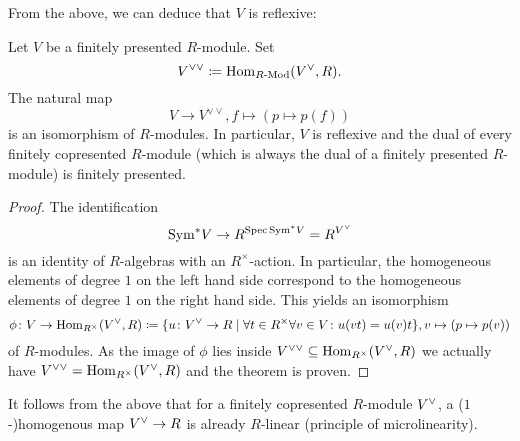 From the above, we can deduce that $V$ is reflexive:

\begin{theorem}
  Let $V$ be a finitely presented $R$-module.  Set
  \begin{equation*}
    V^{\vee\vee} \coloneqq \Hom_{\Mod R}(V\spcheck, R).
  \end{equation*}
  The natural map
  \begin{equation*}
    V \to V^{\vee\vee}, f \mapsto (p \mapsto p(f))
  \end{equation*}
  is an isomorphism of $R$-modules.  In particular, $V$ is reflexive
  and the dual of every finitely copresented $R$-module (which is
  always the dual of a finitely presented $R$-module) is finitely
  presented.
\end{theorem}

\begin{proof}
  The identification
  \begin{equation*}
    \Sym^* V \to R^{\Spec \Sym^* V} = R^{V\spcheck}
  \end{equation*}
  is an identity of $R$-algebras with an $R^\times$-action.  In
  particular, the homogeneous elements of degree $1$ on the left hand
  side correspond to the homogeneous elements of degree $1$ on the
  right hand side.  This yields an isomorphism
  \begin{equation*}
    \phi\colon V \to \Hom_{R^\times}(V\spcheck, R) \coloneqq \{u\colon V\spcheck \to R \mid \forall t \in R^\times\forall v \in V\colon u(vt) = u(v) t\},
    v \mapsto (p \mapsto p(v))
  \end{equation*}
  of $R$-modules.  As the image of $\phi$ lies inside
  $V^{\vee\vee} \subseteq \Hom_{R^\times}(V\spcheck, R)$ we
  actually have $V^{\vee\vee} = \Hom_{R^\times}(V\spcheck, R)$ and
  the theorem is proven.
\end{proof}

\begin{remark}
  It follows from the above that for a finitely copresented $R$-module
  $V\spcheck$, a ($1$-)homogenous map $V\spcheck \to R$ is already
  $R$-linear (principle of microlinearity).
\end{remark}

